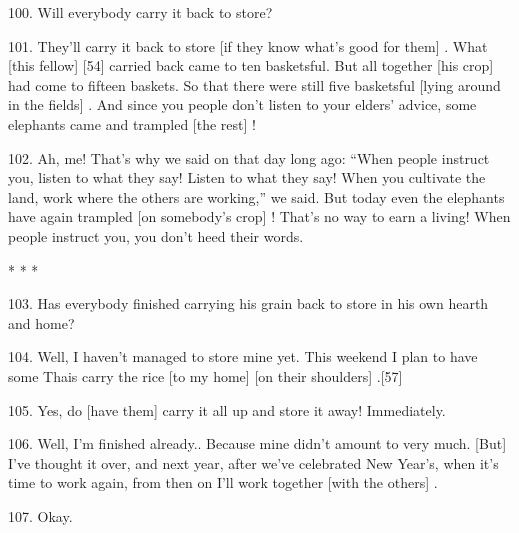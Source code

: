 100. Will everybody carry it back to store?

101. They'll carry it back to store [if they know what's good for them] . What
[this fellow] [54] carried back came to ten basketsful. But all together [his
crop] had come to fifteen baskets. So that there were still five basketsful [lying
around in the fields] . And since you people don't listen to your elders' advice,
some elephants came and trampled [the rest] !

102. Ah, me! That's why we said on that day long ago: ``When people instruct
you, listen to what they say! Listen to what they say! When you cultivate the land,
work where the others are working,'' we said. But today even the elephants
have again trampled [on somebody's crop] ! That's no way to earn a living! When
people instruct you, you don't heed their words.

\begin{center}
* * *
\end{center}

103. Has everybody finished carrying his grain back to store in his own hearth
and home?

104. Well, I haven't managed to store mine yet. This weekend I plan to have some
Thais carry the rice [to my home] [on their shoulders] .[57]

105. Yes, do [have them] carry it all up and store it away! Immediately.

106. Well, I'm finished already.. Because mine didn't amount to very much. [But]
I've thought it over, and next year, after we've celebrated New Year's, when it's
time to work again, from then on I'll work together [with the others] .

107. Okay.

